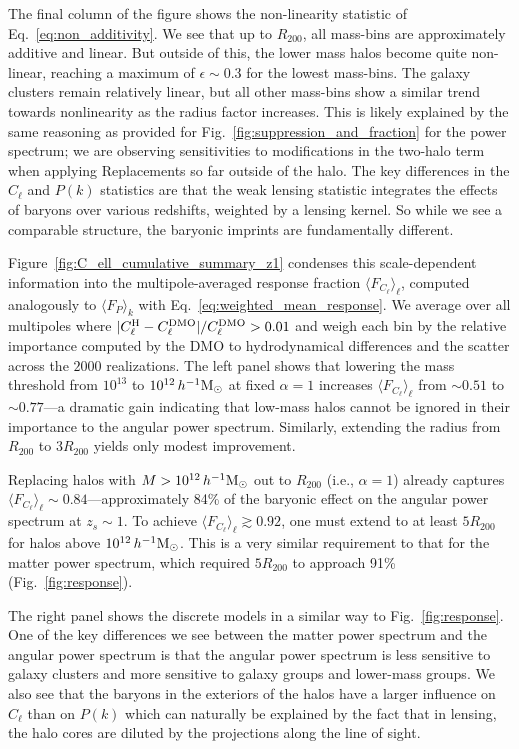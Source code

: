 \documentclass[linenumbers,trackchanges]{aastex701}
\begin{document}
The final column of the figure shows the non-linearity statistic of Eq.~\ref{eq:non_additivity}. We see that up to $R_{200}$, all mass-bins are approximately additive and linear. But outside of this, the lower mass halos become quite non-linear, reaching a maximum of $\epsilon\sim0.3$ for the lowest mass-bins. The galaxy clusters remain relatively linear, but all other mass-bins show a similar trend towards nonlinearity as the radius factor increases. This is likely explained by the same reasoning as provided for Fig.~\ref{fig:suppression_and_fraction} for the power spectrum; we are observing sensitivities to modifications in the two-halo term when applying Replacements so far outside of the halo. The key differences in the $C_\ell$ and $P(k)$ statistics are that the weak lensing statistic integrates the effects of baryons over various redshifts, weighted by a lensing kernel. So while we see a comparable structure, the baryonic imprints are fundamentally different.

Figure~\ref{fig:C_ell_cumulative_summary_z1} condenses this scale-dependent information into the multipole-averaged response fraction $\langle F_{C_\ell} \rangle_\ell$, computed analogously to $\langle F_P \rangle_k$ with Eq.~\ref{eq:weighted_mean_response}. We average over all multipoles where $|C_\ell^{\rm H} - C_\ell^{\rm DMO}|/C_\ell^{\rm DMO} > 0.01$ and weigh each bin by the relative importance computed by the DMO to hydrodynamical differences and the scatter across the $2000$ realizations. The left panel shows that lowering the mass threshold from $10^{13}$ to $10^{12}\,h^{-1}{\rm M}_\odot$ at fixed $\alpha = 1$ increases $\langle F_{C_\ell} \rangle_\ell$ from $\sim 0.51$ to $\sim 0.77$—a dramatic gain indicating that low-mass halos cannot be ignored in their importance to the angular power spectrum. Similarly, extending the radius from $R_{200}$ to $3R_{200}$ yields only modest improvement.

Replacing halos with $M > 10^{12}\,h^{-1}{\rm M}_\odot$ out to $R_{200}$ (i.e., $\alpha = 1$) already captures $\langle F_{C_\ell} \rangle_\ell \sim 0.84$—approximately 84\% of the baryonic effect on the angular power spectrum at $z_s \sim 1$. To achieve $\langle F_{C_\ell} \rangle_\ell \gtrsim 0.92$, one must extend to at least $5R_{200}$ for halos above $10^{12}\,h^{-1}{\rm M}_\odot$. This is a very similar requirement to that for the matter power spectrum, which required $5R_{200}$ to approach 91\% (Fig.~\ref{fig:response}).

The right panel shows the discrete models in a similar way to Fig.~\ref{fig:response}. One of the key differences we see between the matter power spectrum and the angular power spectrum is that the angular power spectrum is less sensitive to galaxy clusters and more sensitive to galaxy groups and lower-mass groups. We also see that the baryons in the exteriors of the halos have a larger influence on $C_\ell$ than on $P(k)$ which can naturally be explained by the fact that in lensing, the halo cores are diluted by the projections along the line of sight. 
\end{document}

